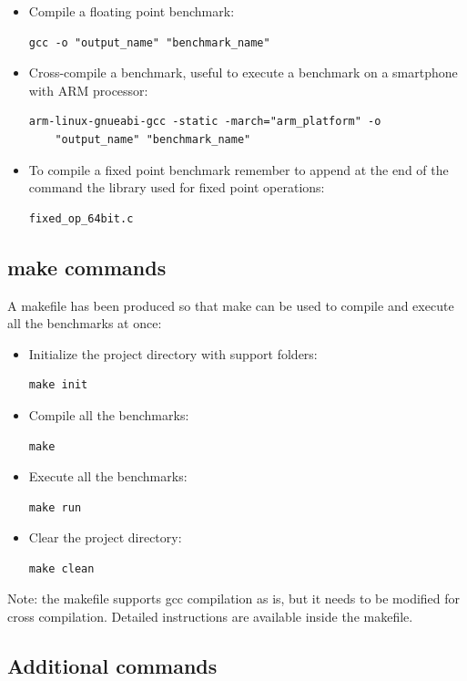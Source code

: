 \begin{itemize}
	\item Compile a floating point benchmark: \begin{verbatim}gcc -o "output_name" "benchmark_name"\end{verbatim}
	\item Cross-compile a benchmark, useful to execute a benchmark on a smartphone with ARM processor: \begin{verbatim}arm-linux-gnueabi-gcc -static -march="arm_platform" -o 
	"output_name" "benchmark_name"\end{verbatim}
	\item To compile a fixed point benchmark remember to append at the end of the command the library used for fixed point operations: \begin{verbatim}fixed_op_64bit.c\end{verbatim}
\end{itemize}


\subsection{make commands}

A makefile has been produced so that make can be used to compile and execute all the benchmarks at once:

\begin{itemize}
	\item Initialize the project directory with support folders:\begin{verbatim}make init\end{verbatim}
	\item Compile all the benchmarks: \begin{verbatim}make\end{verbatim}
	\item Execute all the benchmarks: \begin{verbatim}make run\end{verbatim}
	\item Clear the project directory: \begin{verbatim}make clean\end{verbatim}
\end{itemize}

Note: the makefile supports gcc compilation as is, but it needs to be modified for cross compilation. Detailed instructions are available inside the makefile.

\subsection{Additional commands}

